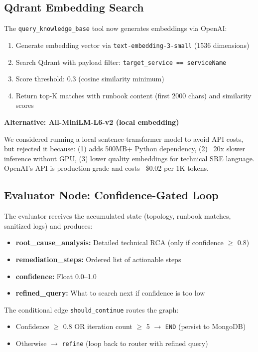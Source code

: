 \documentclass[11pt,a4paper]{article}
\begin{document}
\subsection{Qdrant Embedding Search}

The \texttt{query\_knowledge\_base} tool now generates embeddings via OpenAI:

\begin{enumerate}[leftmargin=*,itemsep=2pt]
  \item Generate embedding vector via \texttt{text-embedding-3-small} (1536 dimensions)
  \item Search Qdrant with payload filter: \texttt{target\_service == serviceName}
  \item Score threshold: 0.3 (cosine similarity minimum)
  \item Return top-K matches with runbook content (first 2000 chars) and similarity scores
\end{enumerate}

\begin{alternativebox}
\textbf{Alternative: All-MiniLM-L6-v2 (local embedding)}

We considered running a local sentence-transformer model to avoid API costs, but rejected it because: (1) adds 500MB+ Python dependency, (2) ~20x slower inference without GPU, (3) lower quality embeddings for technical SRE language. OpenAI's API is production-grade and costs ~\$0.02 per 1K tokens.
\end{alternativebox}

\subsection{Evaluator Node: Confidence-Gated Loop}

The evaluator receives the accumulated state (topology, runbook matches, sanitized logs) and produces:

\begin{itemize}[leftmargin=*,itemsep=2pt]
  \item \textbf{root\_cause\_analysis:} Detailed technical RCA (only if confidence $\geq$ 0.8)
  \item \textbf{remediation\_steps:} Ordered list of actionable steps
  \item \textbf{confidence:} Float 0.0--1.0
  \item \textbf{refined\_query:} What to search next if confidence is too low
\end{itemize}

The conditional edge \texttt{should\_continue} routes the graph:
\begin{itemize}[leftmargin=*,itemsep=2pt]
  \item Confidence $\geq$ 0.8 OR iteration count $\geq$ 5 $\rightarrow$ \texttt{END} (persist to MongoDB)
  \item Otherwise $\rightarrow$ \texttt{refine} (loop back to router with refined query)
\end{itemize}
\end{document}

